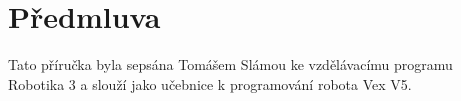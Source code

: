 \documentclass[../main.tex]{subfiles}
\begin{document}
	\setcounter{secnumdepth}{0}
	\section{Předmluva}
	\setcounter{secnumdepth}{3}
	Tato příručka byla sepsána Tomášem Slámou ke vzdělávacímu programu Robotika 3 a slouží jako učebnice k programování robota Vex V5.

	\newpage
\end{document}
